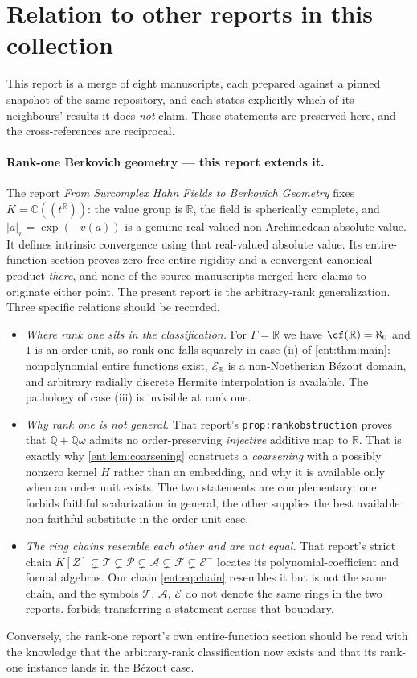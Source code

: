 \documentclass[11pt]{article}
\theoremstyle{plain}
\theoremstyle{plain}
\theoremstyle{plain}
\theoremstyle{definition}
\theoremstyle{definition}
\theoremstyle{definition}
\theoremstyle{definition}
\theoremstyle{remark}
\newcommand{\C}{\mathbb C}\newcommand{\R}{\mathbb R}
\newcommand{\Q}{\mathbb Q}\newcommand{\Z}{\mathbb Z}\newcommand{\N}{\mathbb N}
\begin{document}
\section{Relation to other reports in this collection}
\label{ent:sec:collection}

This report is a merge of eight manuscripts, each prepared against a pinned
snapshot of the same repository, and each states explicitly which of its
neighbours' results it does \emph{not} claim. Those statements are preserved
here, and the cross-references are reciprocal.

\paragraph{Rank-one Berkovich geometry --- this report extends it.}
The report \emph{From Surcomplex Hahn Fields to Berkovich Geometry}
\cite{RepoRankOne} fixes $K=\C((t^\R))$: the value group is $\R$, the field
is spherically complete, and $|a|_v=\exp(-v(a))$ is a genuine real-valued
non-Archimedean absolute value. It defines intrinsic convergence using that
real-valued absolute value. Its entire-function section proves
zero-free entire rigidity and a convergent canonical product \emph{there},
and none of the source manuscripts merged here claims to originate either
point.
The present report is the arbitrary-rank generalization. Three specific
relations should be recorded.
\begin{itemize}[leftmargin=1.4em]
\item \emph{Where rank one sits in the classification.} For $\Gamma=\R$ we
have $\cf(\R)=\aleph_0$ and $1$ is an order unit, so rank one falls squarely
in case (ii) of \cref{ent:thm:main}: nonpolynomial entire functions exist,
$\mathcal E_\R$ is a non-Noetherian B\'ezout domain, and arbitrary radially
discrete Hermite interpolation is available. The pathology of case (iii) is
invisible at rank one.
\item \emph{Why rank one is not general.} That report's
\texttt{prop:rankobstruction} proves that $\Q+\Q\omega$ admits no
order-preserving \emph{injective} additive map to $\R$. That is exactly why
\cref{ent:lem:coarsening} constructs a \emph{coarsening} with a possibly
nonzero kernel $H$ rather than an embedding, and why it is available only
when an order unit exists. The two statements are complementary: one forbids
faithful scalarization in general, the other supplies the best available
non-faithful substitute in the order-unit case.
\item \emph{The ring chains resemble each other and are not equal.} That
report's strict chain $K[Z]\subsetneq\mathcal T\subsetneq\mathcal P
\subsetneq\mathcal A\subsetneq\mathcal F\subsetneq\mathcal E^-$ locates its
polynomial-coefficient and formal algebras. Our chain
\eqref{ent:eq:chain} resembles it but is not the same chain, and the symbols
$\mathcal T$, $\mathcal A$, $\mathcal E$ do not denote the same rings in the
two reports.  forbids transferring a statement across
that boundary.
\end{itemize}
Conversely, the rank-one report's own entire-function section should be read
with the knowledge that the arbitrary-rank classification now exists and that
its rank-one instance lands in the B\'ezout case.
\end{document}
